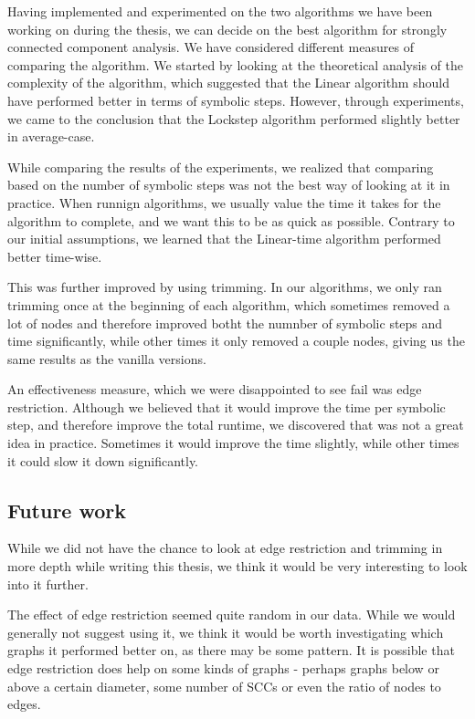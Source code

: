 \documentclass[../master/master.tex]{subfiles}
\begin{document}
Having implemented and experimented on the two algorithms we have been working on during the thesis, we can decide on the best algorithm for strongly connected component analysis. We have considered different measures of comparing the algorithm. We started by looking at the theoretical analysis of the complexity of the algorithm, which suggested that the Linear algorithm should have performed better in terms of symbolic steps. However, through experiments, we came to the conclusion that the Lockstep algorithm performed slightly better in average-case.

While comparing the results of the experiments, we realized that comparing based on the number of symbolic steps was not the best way of looking at it in practice. When runnign algorithms, we usually value the time it takes for the algorithm to complete, and we want this to be as quick as possible. Contrary to our initial assumptions, we learned that the Linear-time algorithm performed better time-wise.

This was further improved by using trimming. In our algorithms, we only ran trimming once at the beginning of each algorithm, which sometimes removed a lot of nodes and therefore improved botht the numnber of symbolic steps and time significantly, while other times it only removed a couple nodes, giving us the same results as the vanilla versions.

An effectiveness measure, which we were disappointed to see fail was edge restriction. Although we believed that it would improve the time per symbolic step, and therefore improve the total runtime, we discovered that was not a great idea in practice. Sometimes it would improve the time slightly, while other times it could slow it down significantly.


\subsection{Future work}
While we did not have the chance to look at edge restriction and trimming in more depth while writing this thesis, we think it would be very interesting to look into it further.

The effect of edge restriction seemed quite random in our data. While we would generally not suggest using it, we think it would be worth investigating which graphs it performed better on, as there may be some pattern. It is possible that edge restriction does help on some kinds of graphs - perhaps graphs below or above a certain diameter, some number of SCCs or even the ratio of nodes to edges.
\end{document}
